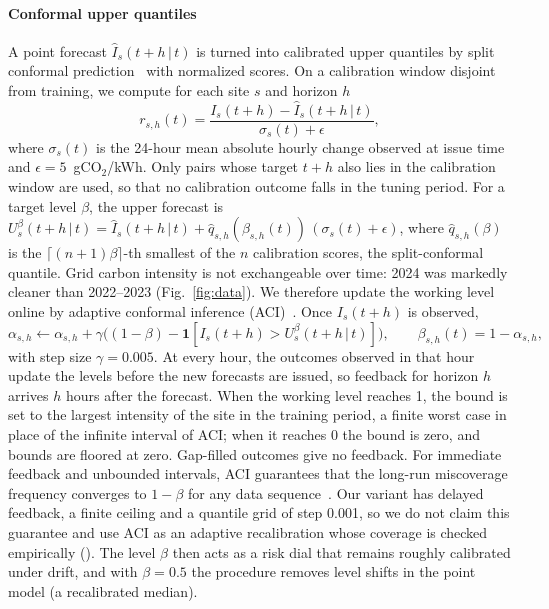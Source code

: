 \paragraph{Conformal upper quantiles} A point forecast $\hat I_s(t+h\,|\,t)$ is turned into calibrated upper quantiles by split conformal prediction~\cite{vovk2005algorithmic,lei2018distribution} with normalized scores. On a calibration window disjoint from training, we compute for each site $s$ and horizon $h$
\begin{equation}
r_{s,h}(t) = \frac{I_s(t+h)-\hat I_s(t+h\,|\,t)}{\sigma_s(t)+\epsilon},
\end{equation}
where $\sigma_s(t)$ is the 24-hour mean absolute hourly change observed at issue time and $\epsilon=5$~gCO$_2$/kWh. Only pairs whose target $t+h$ also lies in the calibration window are used, so that no calibration outcome falls in the tuning period. For a target level $\beta$, the upper forecast is $U^{\beta}_s(t+h\,|\,t)=\hat I_s(t+h\,|\,t)+\hat q_{s,h}(\beta_{s,h}(t))\,(\sigma_s(t)+\epsilon)$, where $\hat q_{s,h}(\beta)$ is the $\lceil(n+1)\beta\rceil$-th smallest of the $n$ calibration scores, the split-conformal quantile. Grid carbon intensity is not exchangeable over time: 2024 was markedly cleaner than 2022--2023 (Fig.~\ref{fig:data}). We therefore update the working level online by adaptive conformal inference (ACI)~\cite{gibbs2021adaptive}. Once $I_s(t+h)$ is observed,
\begin{equation}\label{eq:aci}
\alpha_{s,h} \leftarrow \alpha_{s,h} + \gamma\big((1-\beta) - \mathbf{1}[I_s(t+h) > U^{\beta}_s(t+h\,|\,t)]\big),\qquad \beta_{s,h}(t)=1-\alpha_{s,h},
\end{equation}
with step size $\gamma=0.005$. At every hour, the outcomes observed in that hour update the levels before the new forecasts are issued, so feedback for horizon $h$ arrives $h$ hours after the forecast. When the working level reaches 1, the bound is set to the largest intensity of the site in the training period, a finite worst case in place of the infinite interval of ACI; when it reaches 0 the bound is zero, and bounds are floored at zero. Gap-filled outcomes give no feedback. For immediate feedback and unbounded intervals, ACI guarantees that the long-run miscoverage frequency converges to $1-\beta$ for any data sequence~\cite{gibbs2021adaptive}. Our variant has delayed feedback, a finite ceiling and a quantile grid of step 0.001, so we do not claim this guarantee and use ACI as an adaptive recalibration whose coverage is checked empirically (). The level $\beta$ then acts as a risk dial that remains roughly calibrated under drift, and with $\beta=0.5$ the procedure removes level shifts in the point model (a recalibrated median).

